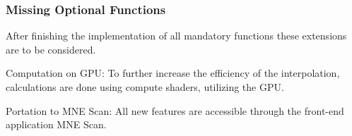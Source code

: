 \subsubsection{Missing Optional Functions}
After finishing the implementation of all mandatory functions these extensions are to be considered. 

\begin{aims}
	\item[\hspace*{11mm} Computation on GPU:]To further increase the efficiency of the interpolation, calculations are done using compute                							 shaders, utilizing the GPU. 
	\item[\hspace*{11mm} Portation to MNE Scan:]All new features are accessible through the front-end application MNE Scan.
\end{aims}
